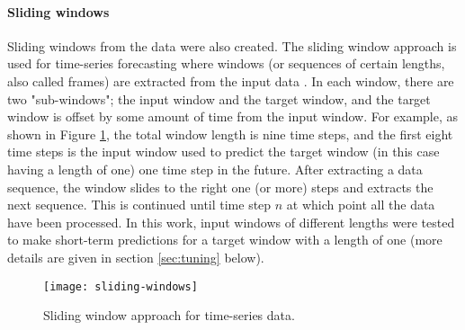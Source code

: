 \paragraph{Sliding windows}
Sliding windows from the data were also created. The sliding window approach is used for time-series forecasting where windows (or sequences of certain lengths, also called frames) are extracted from the input data \cite{Arsov2021, Gilik2021}. In each window, there are two "sub-windows"; the input window and the target window, and the target window is offset by some amount of time from the input window. For example, as shown in Figure \ref{fig:sliding-window}, the total window length is nine time steps, and the first eight time steps is the input window used to predict the target window (in this case having a length of one) one time step in the future. After extracting a data sequence, the window slides to the right one (or more) steps and extracts the next sequence. This is continued until time step $n$ at which point all the data have been processed. 
In this work, input windows of different lengths were tested to make short-term predictions for a target window with a length of one (more details are given in section \ref{sec:tuning} below). 

 \begin{figure}[h]
\begin{center}
\texttt{[image: sliding-windows]}
\caption{Sliding window approach for time-series data.}
\label{fig:sliding-window}
\end{center}
\end{figure}



